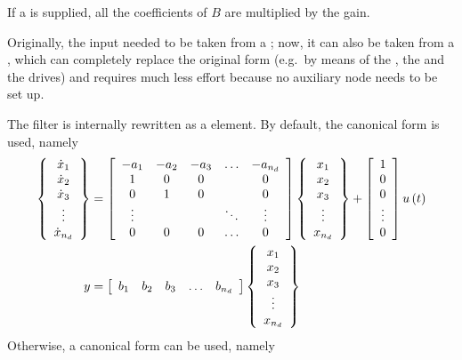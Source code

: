 If a  is supplied, all the coefficients of $ B $
are multiplied by the gain.

Originally, the input needed to be taken from a ;
now, it can also be taken from a , which can completely replace
the original form (e.g.\ by means of the , the 
and the  drives) and requires much less effort because
no auxiliary node needs to be set up.

The filter is internally rewritten as a  element.
By default, the  canonical form is used, namely
\begin{align*}
	\cubr{\cvvect{
		\dot{x}_1 \\
		\dot{x}_2 \\
		\dot{x}_3 \\
		\vdots \\
		\dot{x}_{n_d}
	}} &= \sqbr{\matr{ccccc}{
		-a_1 & -a_2 & -a_3 & \ldots & -a_{n_d} \\
		1 & 0 & 0 & & 0 \\
		0 & 1 & 0 & & 0 \\
		\vdots & & & \ddots & \vdots \\
		0 & 0 & 0 & \ldots & 0
	}} \cubr{\cvvect{
		x_1 \\
		x_2 \\
		x_3 \\
		\vdots \\
		x_{n_d}
	}} + \sqbr{\cvvect{
		1 \\
		0 \\
		0 \\
		\vdots \\
		0
	}} u\plbr{t} \\
	y &= \sqbr{\matr{ccccc}{
		b_1 & b_2 & b_3 & \ldots & b_{n_d}
	}} \cubr{\cvvect{
		x_1 \\
		x_2 \\
		x_3 \\
		\vdots \\
		x_{n_d}
	}}
\end{align*}
Otherwise, a  canonical form can be used, namely
